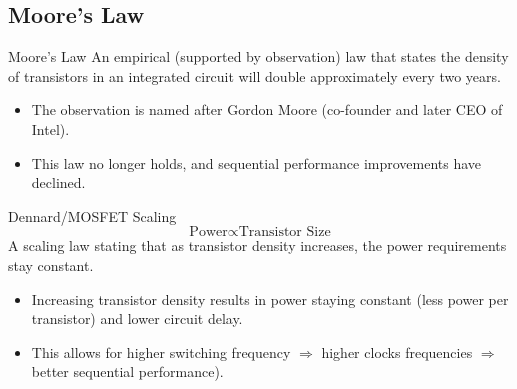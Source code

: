 \subsection{Moore's Law}
\begin{tcbraster}[raster columns=2,raster equal height]
    \begin{definitionbox}{Moore's Law}
        An empirical (supported by observation) law that states the density of transistors in an integrated circuit
        will double approximately every two years.
        \begin{itemize}
            \item The observation is named after Gordon Moore (co-founder and later CEO of Intel).
            \item This law no longer holds, and sequential performance improvements have declined.
        \end{itemize}
    \end{definitionbox}
    \begin{definitionbox}{Dennard/MOSFET Scaling}
        \[\text{Power} \propto \text{Transistor Size}\]
        A scaling law stating that as transistor density increases, the power requirements stay constant. 
        \begin{itemize}
            \setlength\itemsep{0em}
            \item Increasing transistor density results in power staying constant (less power per transistor) and lower circuit delay. 
            \item This allows for higher switching frequency $\Rightarrow$ higher clocks frequencies $\Rightarrow$ better sequential performance).
        \end{itemize}
    \end{definitionbox}
\end{tcbraster}

